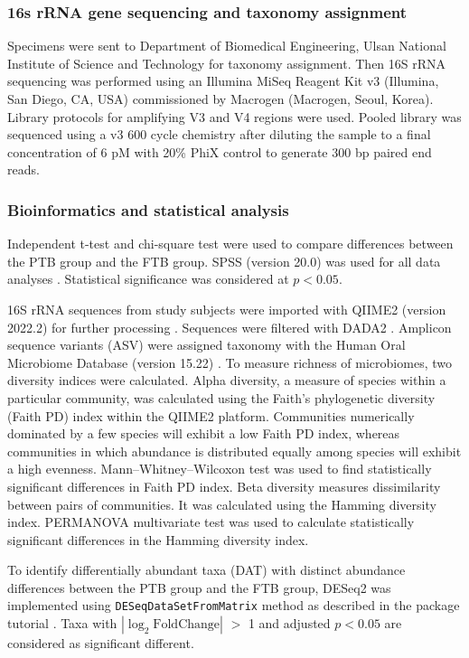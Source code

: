 \documentclass[11pt, a4paper, onecolumn, oneside]{report}
\begin{document}
            \subsubsection{16s rRNA gene sequencing and taxonomy assignment}
                Specimens were sent to Department of Biomedical Engineering, Ulsan National Institute of Science and Technology for taxonomy assignment. Then 16S rRNA sequencing was performed using an Illumina MiSeq Reagent Kit v3 (Illumina, San Diego, CA, USA) commissioned by Macrogen (Macrogen, Seoul, Korea). Library protocols for amplifying V3 and V4 regions were used. Pooled library was sequenced using a v3 600 cycle chemistry after diluting the sample to a final concentration of 6 pM with 20\% PhiX control to generate 300 bp paired end reads.

            \subsubsection{Bioinformatics and statistical analysis}
                Independent t-test and chi-square test were used to compare differences between the PTB group and the FTB group. SPSS (version 20.0) was used for all data analyses \cite{SPSS-1}. Statistical significance was considered at $p < 0.05$.

                16S rRNA sequences from study subjects were imported with QIIME2 (version 2022.2) for further processing \cite{QIIME2-1}. Sequences were filtered with DADA2 \cite{DADA2-1}. Amplicon sequence variants (ASV) were assigned taxonomy with the Human Oral Microbiome Database (version 15.22) \cite{HOMD-1}. To measure richness of microbiomes, two diversity indices were calculated. Alpha diversity, a measure of species within a particular community, was calculated using the Faith’s phylogenetic diversity (Faith PD) index within the QIIME2 platform. Communities numerically dominated by a few species will exhibit a low Faith PD index, whereas communities in which abundance is distributed equally among species will exhibit a high evenness. Mann–Whitney–Wilcoxon test was used to find statistically significant differences in Faith PD index. Beta diversity measures dissimilarity between pairs of communities. It was calculated using the Hamming diversity index. PERMANOVA multivariate test was used to calculate statistically significant differences in the Hamming diversity index.

                To identify differentially abundant taxa (DAT) with distinct abundance differences between the PTB group and the FTB group, DESeq2 was implemented using \texttt{DESeqDataSetFromMatrix} method as described in the package tutorial \cite{DESeq2-1}. Taxa with $| \log _2 \textrm{FoldChange} |$ $>$ 1 and adjusted $p < 0.05$ are considered as significant different.
\end{document}
